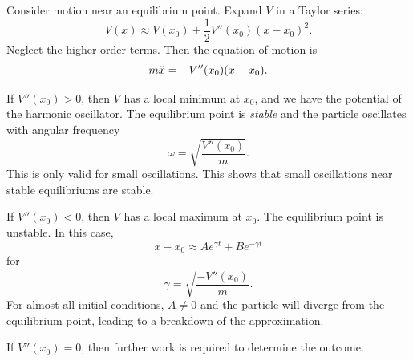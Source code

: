 \documentclass[a4paper]{article}
\begin{document}
Consider motion near an equilibrium point. Expand $V$ in a Taylor series:
\[
  V(x) \approx V(x_0) + \frac{1}{2}V''(x_0)(x - x_0)^2.
\]
Neglect the higher-order terms. Then the equation of motion is 
\[
  m\ddot{x} = -V''(x_0)(x - x_0).\\
\]

If $V''(x_0) > 0$, then $V$ has a local minimum at $x_0$, and we have the potential of the harmonic oscillator. The equilibrium point is \emph{stable} and the particle oscillates with angular frequency
\[
  \omega = \sqrt{\frac{V''(x_0)}{m}}.
\]
This is only valid for small oscillations. This shows that small oscillations near stable equilibriums are stable.

If $V''(x_0) < 0$, then $V$ has a local maximum at $x_0$. The equilibrium point is unstable. In this case,
\[
  x - x_0 \approx Ae^{\gamma t} + Be^{-\gamma t}
\]
for
\[
  \gamma = \sqrt{\frac{-V''(x_0)}{m}}.
\]
For almost all initial conditions, $A \not= 0$ and the particle will diverge from the equilibrium point, leading to a breakdown of the approximation.

If $V''(x_0) = 0$, then further work is required to determine the outcome.
\end{document}
